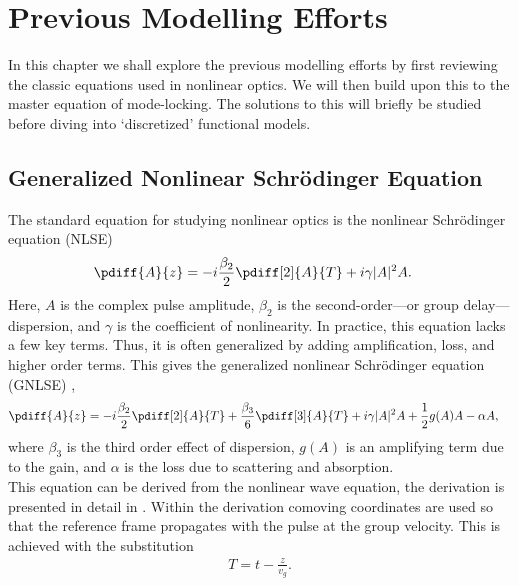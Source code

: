 
\chapter{Previous Modelling Efforts}
In this chapter we shall explore the previous modelling efforts by first reviewing the classic equations used in nonlinear optics. We will then build upon this to the master equation of mode-locking. The solutions to this will briefly be studied before diving into `discretized' functional models. \\

\section{Generalized Nonlinear Schr\"odinger Equation}
The standard equation for studying nonlinear optics is the nonlinear Schr\"odinger equation (NLSE) \cite{agrawal2013, anderson, burgoyne2007, desurvire, ferreira, finot, rothenberg}
\begin{align*}
\pdiff{A}{z} &= - i \frac{\beta_2}{2}\pdiff[2]{A}{T} + i \gamma |A|^2 A.
\end{align*}
Here, $A$ is the complex pulse amplitude, $\beta_2$ is the second-order---or group delay---dispersion, and $\gamma$ is the coefficient of nonlinearity. In practice, this equation lacks a few key terms. Thus, it is often generalized by adding amplification, loss, and higher order terms. This gives the generalized nonlinear Schr\"odinger equation (GNLSE) \cite{agrawal2013, bohun, finot, peng, shtyrina, yarutkina},
\begin{align}
\label{eq:nlse}
\pdiff{A}{z} &= - i \frac{\beta_2}{2}\pdiff[2]{A}{T} + \frac{\beta_3}{6}\pdiff[3]{A}{T} + i \gamma |A|^2 A + \frac{1}{2}g(A) A - \alpha A,
\end{align}
where $\beta_3$ is the third order effect of dispersion, $g(A)$ is an amplifying term due to the gain, and $\alpha$ is the loss due to scattering and absorption. \\

This equation can be derived from the nonlinear wave equation, the derivation is presented in detail in \cite{agrawal2013, ferreira}. Within the derivation comoving coordinates are used so that the reference frame propagates with the pulse at the group velocity. This is achieved with the substitution
\begin{align*}
T = t - \frac{z}{v_g}.
\end{align*}

